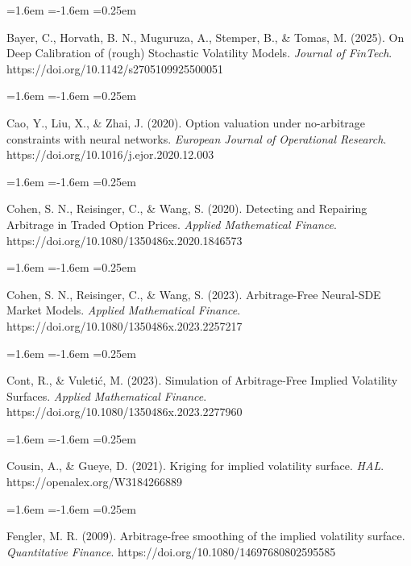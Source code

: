 \documentclass[11pt]{article}
\begin{document}
\begin{list}{}{\leftmargin=1.6em \itemindent=-1.6em \itemsep=0.25em}
\item Bayer, C., Horvath, B. N., Muguruza, A., Stemper, B., \& Tomas, M. (2025). On Deep Calibration of (rough) Stochastic Volatility Models. \textit{Journal of FinTech}. https://doi.org/10.1142/s2705109925500051
\end{list}
\begin{list}{}{\leftmargin=1.6em \itemindent=-1.6em \itemsep=0.25em}
\item Cao, Y., Liu, X., \& Zhai, J. (2020). Option valuation under no-arbitrage constraints with neural networks. \textit{European Journal of Operational Research}. https://doi.org/10.1016/j.ejor.2020.12.003
\end{list}
\begin{list}{}{\leftmargin=1.6em \itemindent=-1.6em \itemsep=0.25em}
\item Cohen, S. N., Reisinger, C., \& Wang, S. (2020). Detecting and Repairing Arbitrage in Traded Option Prices. \textit{Applied Mathematical Finance}. https://doi.org/10.1080/1350486x.2020.1846573
\end{list}
\begin{list}{}{\leftmargin=1.6em \itemindent=-1.6em \itemsep=0.25em}
\item Cohen, S. N., Reisinger, C., \& Wang, S. (2023). Arbitrage-Free Neural-SDE Market Models. \textit{Applied Mathematical Finance}. https://doi.org/10.1080/1350486x.2023.2257217
\end{list}
\begin{list}{}{\leftmargin=1.6em \itemindent=-1.6em \itemsep=0.25em}
\item Cont, R., \& Vuletić, M. (2023). Simulation of Arbitrage-Free Implied Volatility Surfaces. \textit{Applied Mathematical Finance}. https://doi.org/10.1080/1350486x.2023.2277960
\end{list}
\begin{list}{}{\leftmargin=1.6em \itemindent=-1.6em \itemsep=0.25em}
\item Cousin, A., \& Gueye, D. (2021). Kriging for implied volatility surface. \textit{HAL}. https://openalex.org/W3184266889
\end{list}
\begin{list}{}{\leftmargin=1.6em \itemindent=-1.6em \itemsep=0.25em}
\item Fengler, M. R. (2009). Arbitrage-free smoothing of the implied volatility surface. \textit{Quantitative Finance}. https://doi.org/10.1080/14697680802595585
\end{list}
\end{document}
